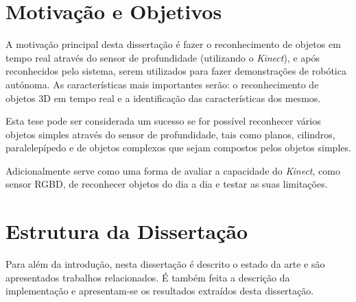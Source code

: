 \section{Motivação e Objetivos} \label{sec:goals}


A motivação principal desta dissertação é fazer o reconhecimento de objetos em tempo real através do sensor de profundidade (utilizando o \emph{Kinect}), e após reconhecidos pelo sistema, serem utilizados para fazer demonstrações de robótica autónoma. As características mais importantes serão: o reconhecimento de objetos 3D em tempo real e a identificação das características dos mesmos.

Esta tese pode ser considerada um sucesso se for possível  reconhecer vários objetos simples através do sensor de profundidade, tais como planos, cilindros, paralelepípedo e de objetos complexos que sejam compostos pelos objetos simples.

Adicionalmente serve como uma forma de avaliar a capacidade do \emph{Kinect}, como sensor RGBD, de reconhecer objetos do dia a dia e testar as suas limitações.


\section{Estrutura da Dissertação} \label{sec:struct}

Para além da introdução, nesta dissertação é descrito o estado da arte e são
apresentados trabalhos relacionados. É também feita a descrição da implementação e apresentam-se os resultados extraídos desta dissertação.
